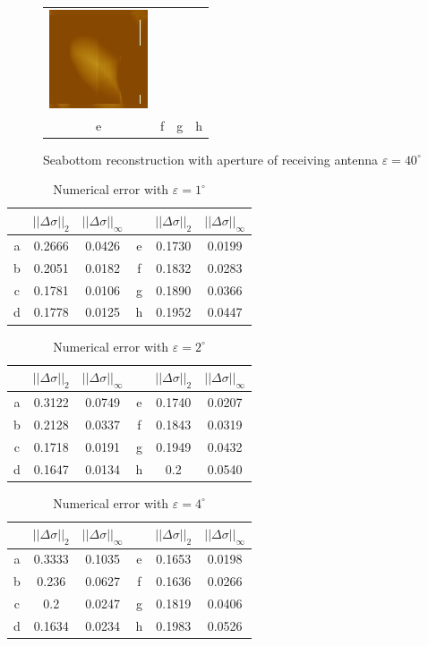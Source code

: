\documentclass{procDDs}
\begin{document}
\begin{figure}[h!]
\begin{tabular}{cccc}
		\includegraphics[width=0.2\linewidth]{k-img-17-12.jpg}\\
		e & f & g & h
	\end{tabular}
	\caption{Seabottom reconstruction with aperture of receiving antenna $\varepsilon=40^\circ$}
	\label{ris:desc6}
\end{figure}
\begin{table}[h!]
	\begin{tabular}{|c|c|c||c|c|c|}
		\hline
		& $||\Delta\sigma||_2$ & $||\Delta\sigma||_\infty$ &
		& $||\Delta\sigma||_2$ & $||\Delta\sigma||_\infty$ \\ \hline
		a & 0.2666 & 0.0426 & e &  0.1730 & 0.0199\\ \hline
		b & 0.2051 & 0.0182 & f &  0.1832 & 0.0283\\ \hline
		c & 0.1781 & 0.0106 & g &  0.1890 & 0.0366\\ \hline
		d & 0.1778 & 0.0125 & h &  0.1952 & 0.0447\\ \hline
	\end{tabular}
	\label{table:desc1}
	\caption{Numerical error with $\varepsilon=1^\circ$}
\end{table}
\begin{table}[h!]
	\begin{tabular}{|c|c|c||c|c|c|}
		\hline
		& $||\Delta\sigma||_2$ & $||\Delta\sigma||_\infty$ &
		& $||\Delta\sigma||_2$ & $||\Delta\sigma||_\infty$ \\ \hline
		a & 0.3122 & 0.0749 & e &  0.1740 & 0.0207\\ \hline
		b & 0.2128 & 0.0337 & f &  0.1843 & 0.0319\\ \hline
		c & 0.1718 & 0.0191 & g &  0.1949 & 0.0432\\ \hline
		d & 0.1647 & 0.0134 & h &  0.2 & 0.0540\\ \hline
	\end{tabular}
	\label{table:desc2}
	\caption{Numerical error with $\varepsilon=2^\circ$}	
\end{table}
\begin{table}[h!]
	\begin{tabular}{|c|c|c||c|c|c|}
		\hline
		& $||\Delta\sigma||_2$ & $||\Delta\sigma||_\infty$ &
		& $||\Delta\sigma||_2$ & $||\Delta\sigma||_\infty$ \\ \hline
		a & 0.3333 & 0.1035 & e &  0.1653 & 0.0198\\ \hline
		b & 0.236 & 0.0627 & f &  0.1636 & 0.0266\\ \hline
		c & 0.2 & 0.0247 & g &  0.1819 & 0.0406\\ \hline
		d & 0.1634 & 0.0234 & h &  0.1983 & 0.0526\\ \hline
	\end{tabular}
	\label{table:desc3}
	\caption{Numerical error with $\varepsilon=4^\circ$}	
\end{table}
\end{document}

